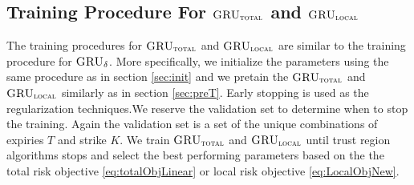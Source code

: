 \documentclass[letterpaper,12pt,titlepage,oneside,final]{book}
\numberwithin{equation}{section}
\theoremstyle{definition}
\newcommand{\model}{\textsc{GRU}_\delta}
\newcommand{\modelT}{\textsc{GRU}_{\textsc{total}}}
\newcommand{\modelL}{\textsc{GRU}_{\textsc{local}}}
\begin{document}
\subsection{Training Procedure For $\modelT$ and $\modelL$}
\label{sec:TotalModelProcedure}
The training procedures for $\modelT$ and $\modelL$ are similar to the training procedure for $\model$. More specifically, we  initialize the  parameters using the same procedure as in section \ref{sec:init} and we pretain the $\modelT$ and $\modelL$ similarly as in section \ref{sec:preT}. Early stopping is used as the regularization techniques.We reserve the validation set to determine when to stop the training. Again the validation set is a set of the unique combinations of  expiries $T$ and strike $K$. 
We train $\modelT$ and $\modelL$ until trust region algorithms stops and select the best performing parameters based on the the total risk objective \eqref{eq:totalObjLinear} or local risk objective \eqref{eq:LocalObjNew}.
\end{document}
